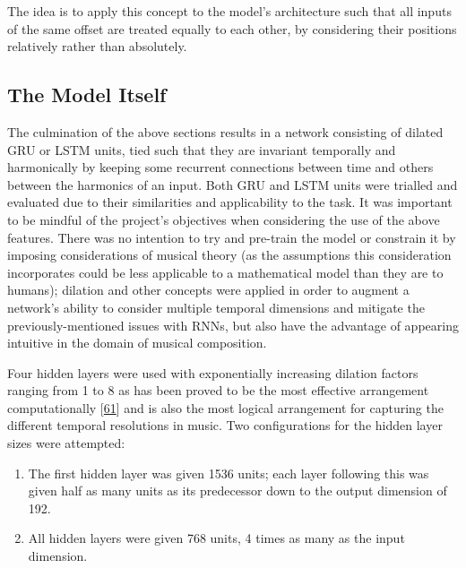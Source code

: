 \documentclass[12pt,]{article}
\providecommand{\tightlist}{%
  \setlength{\itemsep}{0pt}\setlength{\parskip}{0pt}}
\begin{document}
The idea is to apply this concept to the model's architecture such that
all inputs of the same offset are treated equally to each other, by
considering their positions relatively rather than absolutely.

\hypertarget{the-model-itself}{%
\subsection{The Model Itself}\label{the-model-itself}}

The culmination of the above sections results in a network consisting of
dilated GRU or LSTM units, tied such that they are invariant temporally
and harmonically by keeping some recurrent connections between time and
others between the harmonics of an input. Both GRU and LSTM units were
trialled and evaluated due to their similarities and applicability to
the task. It was important to be mindful of the project's objectives
when considering the use of the above features. There was no intention
to try and pre-train the model or constrain it by imposing
considerations of musical theory (as the assumptions this consideration
incorporates could be less applicable to a mathematical model than they
are to humans); dilation and other concepts were applied in order to
augment a network's ability to consider multiple temporal dimensions and
mitigate the previously-mentioned issues with RNNs, but also have the
advantage of appearing intuitive in the domain of musical composition.

Four hidden layers were used with exponentially increasing dilation
factors ranging from 1 to 8 as has been proved to be the most effective
arrangement computationally
{[}\protect\hyperlink{ref-chang2017dilated}{61}{]} and is also the most
logical arrangement for capturing the different temporal resolutions in
music. Two configurations for the hidden layer sizes were attempted:

\begin{enumerate}
\def\labelenumi{\arabic{enumi}.}
\tightlist
\item
  The first hidden layer was given 1536 units; each layer following this
  was given half as many units as its predecessor down to the output
  dimension of 192.
\item
  All hidden layers were given 768 units, 4 times as many as the input
  dimension.
\end{enumerate}
\end{document}
